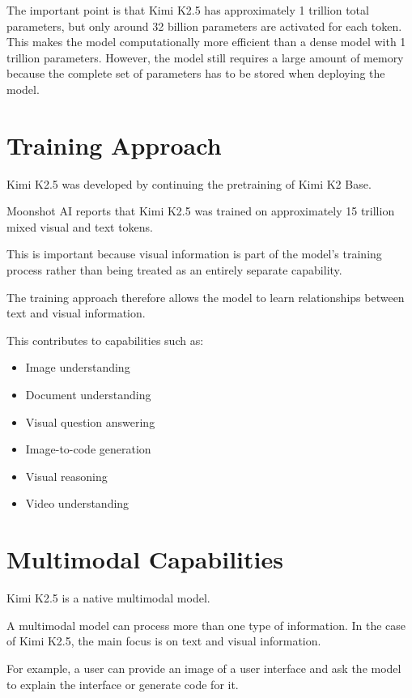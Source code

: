 \documentclass{article}
\begin{document}
The important point is that Kimi K2.5 has approximately 1 trillion total parameters, but only around 32 billion parameters are activated for each token. This makes the model computationally more efficient than a dense model with 1 trillion parameters. However, the model still requires a large amount of memory because the complete set of parameters has to be stored when deploying the model.

\section{Training Approach}
Kimi K2.5 was developed by continuing the pretraining of Kimi K2 Base.

Moonshot AI reports that Kimi K2.5 was trained on approximately 15 trillion mixed visual and text tokens.

This is important because visual information is part of the model's training process rather than being treated as an entirely separate capability.

The training approach therefore allows the model to learn relationships between text and visual information.

This contributes to capabilities such as:

\begin{itemize}
\item Image understanding
\item Document understanding
\item Visual question answering
\item Image-to-code generation
\item Visual reasoning
\item Video understanding
\end{itemize}






\section{Multimodal Capabilities}

Kimi K2.5 is a native multimodal model.

A multimodal model can process more than one type of information. In the case of Kimi K2.5, the main focus is on text and visual information.

For example, a user can provide an image of a user interface and ask the model to explain the interface or generate code for it.
\end{document}
